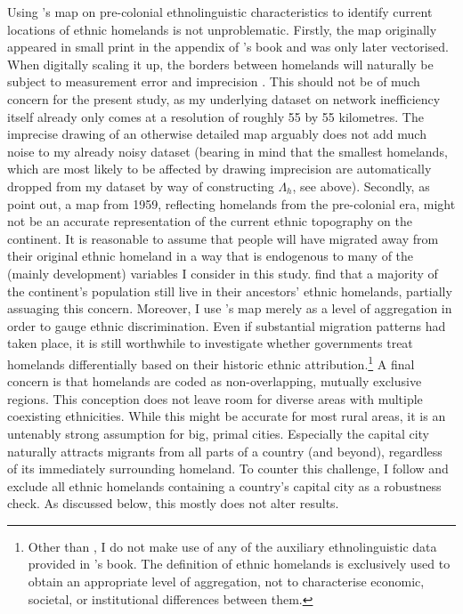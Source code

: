 \documentclass[11pt, oneside]{article}   	%
\begin{document}
Using \citeauthor{Murdock_Africaitspeoples_1959}'s map on pre-colonial ethnolinguistic characteristics to identify current locations of ethnic homelands is not unproblematic. Firstly, the map originally appeared in small print in the appendix of \citeauthor{Murdock_Africaitspeoples_1959}'s book and was only later vectorised. When digitally scaling it up, the borders between homelands will naturally be subject to measurement error and imprecision \citep{michalopoulos_pre-colonial_2013}. This should not be of much concern for the present study, as my underlying dataset on network inefficiency itself already only comes at a resolution of roughly 55 by 55 kilometres. The imprecise drawing of an otherwise detailed map arguably does not add much noise to my already noisy dataset (bearing in mind that the smallest homelands, which are most likely to be affected by drawing imprecision are automatically dropped from my dataset by way of constructing $\Lambda_{h}$, see above). Secondly, as \cite{michalopoulos_pre-colonial_2013} point out, a map from 1959, reflecting homelands from the pre-colonial era, might not be an accurate representation of the current ethnic topography on the continent. It is reasonable to assume that people will have migrated away from their original ethnic homeland in a way that is endogenous to many of the (mainly development) variables I consider in this study. \cite{nunn_slave_2011} find that a majority of the continent's population still live in their ancestors' ethnic homelands, partially assuaging this concern. Moreover, I use \citeauthor{Murdock_Africaitspeoples_1959}'s map merely as a level of aggregation in order to gauge ethnic discrimination. Even if substantial migration patterns had taken place, it is still worthwhile to investigate whether governments treat homelands differentially based on their historic ethnic attribution.\footnote{Other than \cite{michalopoulos_pre-colonial_2013,michalopoulos_long-run_2016}, I do not make use of any of the auxiliary ethnolinguistic data provided in \citeauthor{Murdock_Africaitspeoples_1959}'s book. The definition of ethnic homelands is exclusively used to obtain an appropriate level of aggregation, not to characterise economic, societal, or institutional differences between them.} A final concern is that homelands are coded as non-overlapping, mutually exclusive regions. This conception does not leave room for diverse areas with multiple coexisting ethnicities. While this might be accurate for most rural areas, it is an untenably strong assumption for big, primal cities. Especially the capital city naturally attracts migrants from all parts of a country (and beyond), regardless of its immediately surrounding homeland. To counter this challenge, I follow \cite{Alesina_Ethnicinequality_2016} and exclude all ethnic homelands containing a country's capital city as a robustness check. As discussed below, this mostly does not alter results.
\end{document}

